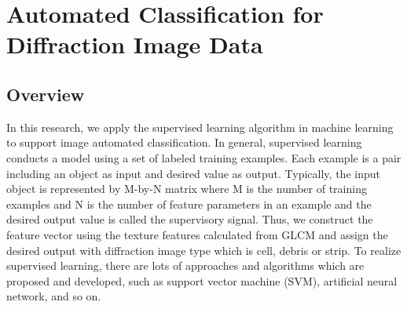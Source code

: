 
\renewcommand{\thechapter}{3}

\chapter{Automated Classification for Diffraction Image Data}

\section{Overview}
In this research, we apply the supervised learning algorithm in machine learning to support image automated classification. In general, supervised learning conducts a model using a set of labeled training examples\cite{Mehryar}. Each example is a pair including an object as input and desired value as output. Typically, the input object is represented by M-by-N matrix where M is the number of training examples and N is the number of feature parameters in an example and the desired output value is called the supervisory signal. Thus, we construct the feature vector using the texture features calculated from GLCM and assign the desired output with diffraction image type which is cell, debris or strip. To realize supervised learning, there are lots of approaches and algorithms which are proposed and developed, such as support vector machine (SVM)\cite{Cortes}, artificial neural network\cite{McCulloch}, and so on.

